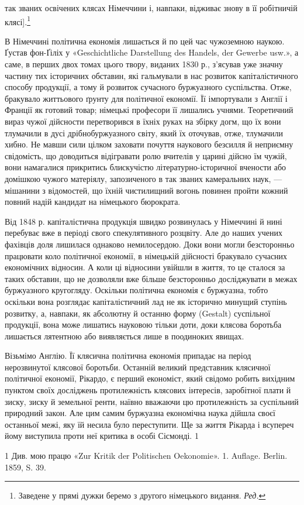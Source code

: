 так званих освічених клясах Німеччини і, навпаки, відживає
знову в її робітничій клясі].\footnote*{
Заведене у прямі дужки беремо з другого німецького видання. \emph{Ред.}
}

В Німеччині політична економія лишається й по цей час чужоземною
наукою. Ґустав фон-Ґіліх у «Geschichtliche Darstellung
des Handels, der Gewerbe usw.», а саме, в перших двох томах
цього твору, виданих 1830 р., з’ясував уже значну частину тих
історичних обставин, які гальмували в нас розвиток капіталістичного
способу продукції, а тому й розвиток сучасного буржуазного
суспільства. Отже, бракувало життьового ґрунту для політичної
економії. Її імпортували з Англії і Франції як готовий товар;
німецькі професори її лишались учнями. Теоретичний вираз чужої
дійсности перетворився в їхніх руках на збірку догм, що їх
вони тлумачили в дусі дрібнобуржуазного світу, який їх оточував,
отже, тлумачили хибно. Не мавши сили цілком заховати почуття
наукового безсилля й неприємну свідомість, що доводиться
відігравати ролю вчителів у царині дійсно їм чужій, вони намагалися
прикритись блискучістю літературно-історичної вчености
або домішкою чужого матеріялу, запозиченого в так званих камеральних
наук, — мішанини з відомостей, що їхній чистилищний
вогонь повинен пройти кожний повний надій кандидат на
німецького бюрократа.

Від 1848 р. капіталістична продукція швидко розвинулась у
Німеччині й нині перебуває вже в періоді свого спекулятивного
розцвіту. Але до наших учених фахівців доля лишилася однаково
немилосердою. Доки вони могли безсторонньо працювати коло
політичної економії, в німецькій дійсності бракувало сучасних економічних
відносин. А коли ці відносини увійшли в життя, то це сталося
за таких обставин, що не дозволяли вже більше безсторонньо
досліджувати в межах буржуазного кругогляду. Оскільки політична
економія є буржуазна, тобто оскільки вона розглядає капіталістичний
лад не як історично минущий ступінь розвитку,
а, навпаки, як абсолютну й останню форму (Gestalt) суспільної
продукції, вона може лишатись науковою тільки доти, доки клясова
боротьба лишається лятентною або виявляється лише в
поодиноких явищах.

Візьмімо Англію. Її клясична політична економія припадає на
період нерозвинутої клясової боротьби. Останній великий представник
клясичної політичної економії, Рікардо, є перший економіст,
який свідомо робить вихідним пунктом своїх досліджень
протилежність клясових інтересів, заробітної плати й зиску, зиску
й земельної ренти, наївно вважаючи цю протилежність за суспільний
природний закон. Але цим самим буржуазна економічна
наука дійшла своєї останньої межі, яку їй несила було переступити.
Ще за життя Рікарда і всупереч йому виступила проти
неї критика в особі Сісмонді. 1

1 Див. мою працю «Zur Kritik der Politischen Oekonomie». 1. Auflage.
Berlin. 1859, S. 39.